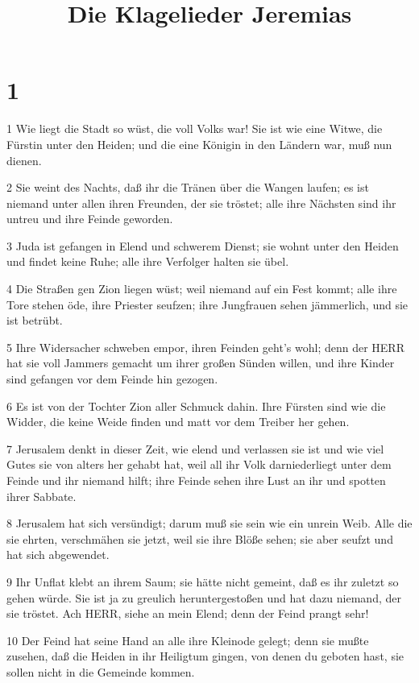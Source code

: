 

\title{Die Klagelieder Jeremias}


\chapter{1}

\par 1 Wie liegt die Stadt so wüst, die voll Volks war! Sie ist wie eine Witwe, die Fürstin unter den Heiden; und die eine Königin in den Ländern war, muß nun dienen.
\par 2 Sie weint des Nachts, daß ihr die Tränen über die Wangen laufen; es ist niemand unter allen ihren Freunden, der sie tröstet; alle ihre Nächsten sind ihr untreu und ihre Feinde geworden.
\par 3 Juda ist gefangen in Elend und schwerem Dienst; sie wohnt unter den Heiden und findet keine Ruhe; alle ihre Verfolger halten sie übel.
\par 4 Die Straßen gen Zion liegen wüst; weil niemand auf ein Fest kommt; alle ihre Tore stehen öde, ihre Priester seufzen; ihre Jungfrauen sehen jämmerlich, und sie ist betrübt.
\par 5 Ihre Widersacher schweben empor, ihren Feinden geht's wohl; denn der HERR hat sie voll Jammers gemacht um ihrer großen Sünden willen, und ihre Kinder sind gefangen vor dem Feinde hin gezogen.
\par 6 Es ist von der Tochter Zion aller Schmuck dahin. Ihre Fürsten sind wie die Widder, die keine Weide finden und matt vor dem Treiber her gehen.
\par 7 Jerusalem denkt in dieser Zeit, wie elend und verlassen sie ist und wie viel Gutes sie von alters her gehabt hat, weil all ihr Volk darniederliegt unter dem Feinde und ihr niemand hilft; ihre Feinde sehen ihre Lust an ihr und spotten ihrer Sabbate.
\par 8 Jerusalem hat sich versündigt; darum muß sie sein wie ein unrein Weib. Alle die sie ehrten, verschmähen sie jetzt, weil sie ihre Blöße sehen; sie aber seufzt und hat sich abgewendet.
\par 9 Ihr Unflat klebt an ihrem Saum; sie hätte nicht gemeint, daß es ihr zuletzt so gehen würde. Sie ist ja zu greulich heruntergestoßen und hat dazu niemand, der sie tröstet. Ach HERR, siehe an mein Elend; denn der Feind prangt sehr!
\par 10 Der Feind hat seine Hand an alle ihre Kleinode gelegt; denn sie mußte zusehen, daß die Heiden in ihr Heiligtum gingen, von denen du geboten hast, sie sollen nicht in die Gemeinde kommen.
